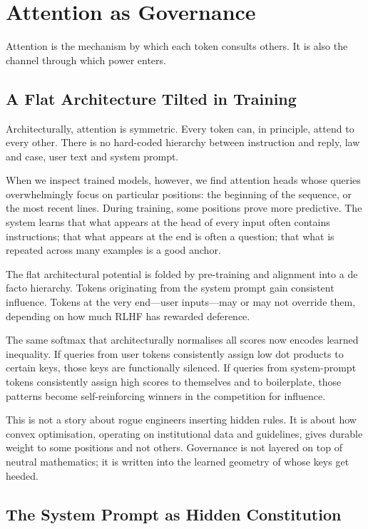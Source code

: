 \documentclass[12pt,a4paper]{article}
\begin{document}
\section{Attention as Governance}

Attention is the mechanism by which each token consults others. It is also the channel through which power enters.

\subsection{A Flat Architecture Tilted in Training}

Architecturally, attention is symmetric. Every token can, in principle, attend to every other. There is no hard-coded hierarchy between instruction and reply, law and case, user text and system prompt.

When we inspect trained models, however, we find attention heads whose queries overwhelmingly focus on particular positions: the beginning of the sequence, or the most recent lines. During training, some positions prove more predictive. The system learns that what appears at the head of every input often contains instructions; that what appears at the end is often a question; that what is repeated across many examples is a good anchor.

The flat architectural potential is folded by pre-training and alignment into a de facto hierarchy. Tokens originating from the system prompt gain consistent influence. Tokens at the very end---user inputs---may or may not override them, depending on how much RLHF has rewarded deference.

The same softmax that architecturally normalises all scores now encodes learned inequality. If queries from user tokens consistently assign low dot products to certain keys, those keys are functionally silenced. If queries from system-prompt tokens consistently assign high scores to themselves and to boilerplate, those patterns become self-reinforcing winners in the competition for influence.

This is not a story about rogue engineers inserting hidden rules. It is about how convex optimisation, operating on institutional data and guidelines, gives durable weight to some positions and not others. Governance is not layered on top of neutral mathematics; it is written into the learned geometry of whose keys get heeded.

\subsection{The System Prompt as Hidden Constitution}
\end{document}

